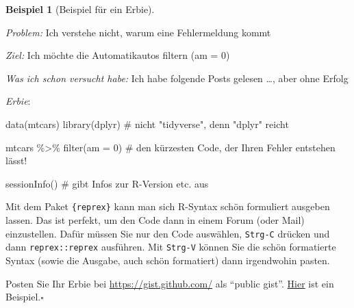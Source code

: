\documentclass[
  a4paper,
  DIV=11]{scrreprt}
\newenvironment{Shaded}{\begin{snugshade}}{\end{snugshade}}
\newcommand{\AttributeTok}[1]{\textcolor[rgb]{0.40,0.45,0.13}{#1}}
\newcommand{\CommentTok}[1]{\textcolor[rgb]{0.37,0.37,0.37}{#1}}
\newcommand{\DecValTok}[1]{\textcolor[rgb]{0.68,0.00,0.00}{#1}}
\newcommand{\FunctionTok}[1]{\textcolor[rgb]{0.28,0.35,0.67}{#1}}
\newcommand{\NormalTok}[1]{\textcolor[rgb]{0.00,0.23,0.31}{#1}}
\newcommand{\SpecialCharTok}[1]{\textcolor[rgb]{0.37,0.37,0.37}{#1}}
\theoremstyle{definition}
\theoremstyle{definition}
\newtheorem{example}{Beispiel}[chapter]
\theoremstyle{definition}
\theoremstyle{remark}
\begin{document}
\begin{example}[Beispiel für ein
Erbie]\protect\hypertarget{exm-erbie}{}\label{exm-erbie}

\emph{Problem:} Ich verstehe nicht, warum eine Fehlermeldung kommt

\emph{Ziel:} Ich möchte die Automatikautos filtern (am = 0)

\emph{Was ich schon versucht habe:} Ich habe folgende Posts gelesen
\ldots, aber ohne Erfolg

\emph{Erbie}:

\begin{Shaded}
\begin{Highlighting}[]
\FunctionTok{data}\NormalTok{(mtcars)}
\FunctionTok{library}\NormalTok{(dplyr)  }\CommentTok{\# nicht "tidyverse", denn "dplyr" reicht}

\NormalTok{mtcars }\SpecialCharTok{\%\textgreater{}\%} 
  \FunctionTok{filter}\NormalTok{(}\AttributeTok{am =} \DecValTok{0}\NormalTok{)  }\CommentTok{\# den kürzesten Code, der Ihren Fehler entstehen lässt!}

\FunctionTok{sessionInfo}\NormalTok{()  }\CommentTok{\# gibt Infos zur R{-}Version etc. aus}
\end{Highlighting}
\end{Shaded}

Mit dem Paket \texttt{\{reprex\}} kann man sich R-Syntax schön
formuliert ausgeben lassen. Das ist perfekt, um den Code dann in einem
Forum (oder Mail) einzustellen. Dafür müssen Sie nur den Code auswählen,
\texttt{Strg-C} drücken und dann \texttt{reprex::reprex} ausführen. Mit
\texttt{Strg-V} können Sie die schön formatierte Syntax (sowie die
Ausgabe, auch schön formatiert) dann irgendwohin pasten.

\end{example}

\begin{tcolorbox}[enhanced jigsaw, leftrule=.75mm, opacitybacktitle=0.6, colback=white, colframe=quarto-callout-tip-color-frame, coltitle=black, colbacktitle=quarto-callout-tip-color!10!white, opacityback=0, left=2mm, breakable, titlerule=0mm, toptitle=1mm, bottomtitle=1mm, rightrule=.15mm, title=\textcolor{quarto-callout-tip-color}{\faLightbulb}\hspace{0.5em}{Tipp}, arc=.35mm, bottomrule=.15mm, toprule=.15mm]

Posten Sie Ihr Erbie bei \url{https://gist.github.com/} als ``public
gist''.
\href{https://gist.github.com/sebastiansauer/0649a0453b5cc7c6a1d16ac760667215}{Hier}
ist ein Beispiel.\(\square\)

\end{tcolorbox}
\end{document}
